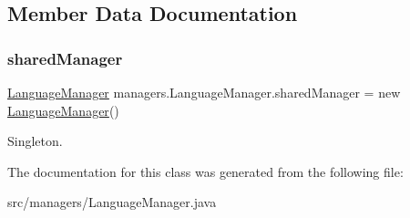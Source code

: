 \subsection{Member Data Documentation}
\mbox{\label{classmanagers_1_1_language_manager_aa1f02355178163bb91caaac9cce4cb7c}} 
\subsubsection{\texorpdfstring{shared\+Manager}{sharedManager}}
{\footnotesize\ttfamily \hyperlink{classmanagers_1_1_language_manager}{Language\+Manager} managers.\+Language\+Manager.\+shared\+Manager = new \hyperlink{classmanagers_1_1_language_manager}{Language\+Manager}()\hspace{0.3cm}{\ttfamily [static]}}

Singleton. 

The documentation for this class was generated from the following file\+:\begin{DoxyCompactItemize}
\item 
src/managers/Language\+Manager.\+java\end{DoxyCompactItemize}
